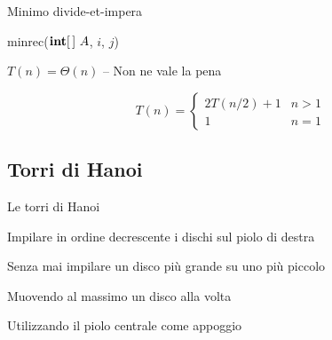 \begin{frame}{Minimo divide-et-impera}
	
\vspace{-9pt}
\begin{Procedure}
\caption[A]{\textsf{minrec}($\INTEGER[\,]\ A$, \INTEGER $i$, \INTEGER $j$)}
\end{Procedure}

\pause
$T(n) = \Theta(n)$ -- Non ne vale la pena

\[
  T(n) = \begin{cases} 
		2T(n/2) + 1 & n>1 \\
		1 & n=1
	\end{cases}
\]

\end{frame}


\subsection{Torri di Hanoi}

\begin{frame}{Le torri di Hanoi}
	
\vspace{-12pt}


\BI
\item Impilare in ordine decrescente i dischi sul piolo di destra
\item Senza mai impilare un disco più grande su uno più piccolo
\item Muovendo al massimo un disco alla volta
\item Utilizzando il piolo centrale come appoggio
\EI

\end{frame}



